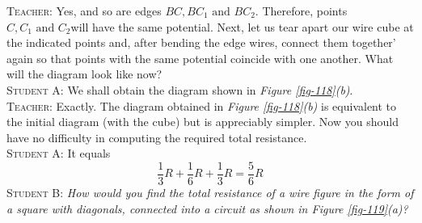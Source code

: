 \documentclass[a4paper,sfsidenotes]{tufte-book}
\begin{document}
\textsc{Teacher:} Yes, and so are edges $BC, BC_{1} \,\, \text{and} \,\, BC_{2}$. Therefore, points  $C, C_{1} \,\, \text{and}\,\, C_{2}$will have the same potential. Next, let us tear apart our wire cube at the indicated points and, after bending the edge wires, connect them together' again so that points with the same potential coincide with one another. What will the diagram look like now?
\\
\textsc{Student A:} We shall obtain the diagram shown in \emph{Figure \ref{fig-118}(b)}.
\\
\textsc{Teacher:} Exactly. The diagram obtained in \emph{Figure \ref{fig-118}(b)} is equivalent to the initial diagram (with the cube) but is appreciably simpler. Now you should have no difficulty in computing the required total resistance.
\\
\textsc{Student A:}
It equals
\begin{equation*}%
\frac{1}{3}R + \frac{1}{6}R + \frac{1}{3}R = \frac{5}{6}R
\end{equation*}
\textsc{Student B:} \emph{How would you find the total resistance of a wire figure in the form of a square with diagonals, connected into a circuit as shown in \emph{Figure \ref{fig-119}(a)}?}
\end{document}
